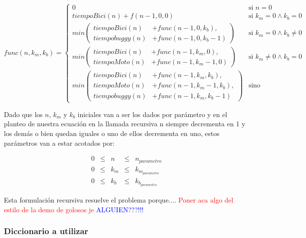 \begin{equation*}
func(n, k_m, k_b) = 
\begin{cases} 
       0  & \mbox{si } n = 0  \\[2ex]
       tiempoBici(n) + f(n-1, 0, 0)  & \mbox{si } k_m=0 \wedge k_b=0 \\[2ex]
      min \left(
      \begin{split}
       tiempoBici(n) & + func(n-1, 0, k_b) , \\
       tiempobuggy(n) & + func(n-1, 0, k_b-1)
\end{split} \right) & \mbox{si } k_m=0 \wedge k_b\neq0 \\[3ex]
      min \left(
      \begin{split}
       tiempoBici(n) & + func(n-1, k_m, 0) , \\
       tiempoMoto(n) & + func(n-1, k_m-1, 0)
\end{split} \right) & \mbox{si } k_m\neq0 \wedge k_b=0 \\[3ex]
           min \left(
      \begin{split}
       tiempoBici(n) & + func(n-1, k_m, k_b) , \\
       tiempoMoto(n) & + func(n-1, k_m-1, k_b) , \\
       tiempobuggy(n) & + func(n-1, k_m, k_b-1)
\end{split} \right) & \mbox{sino}
\end{cases} 
\end{equation*}

Dado que los $n$, $k_m$ y $k_b$ iniciales van a ser los dados por par\'ametro y en el planteo de nuestra ecuaci\'on en la llamada recursiva n siempre decrementa en 1 y los dem\'as o bien quedan iguales o uno de ellos decrementa en uno, estos par\'ametros van a estar acotados por:

\begin{equation*}
\begin{array}{lllll}
0 & \leq & n &\leq & n_{parametro} \\
0 & \leq & k_m & \leq & k_{m_{parametro}} \\
0 & \leq & k_b & \leq & k_{b_{parametro}}
\end{array}
\end{equation*}

\newpage
Esta formulaci\'on recursiva resuelve el problema porque.... \textcolor{red}{Poner aca algo del estilo de la demo de golosos je} \textcolor{blue}{ALGUIEN???!!!}

\subsubsection*{Diccionario a utilizar}

